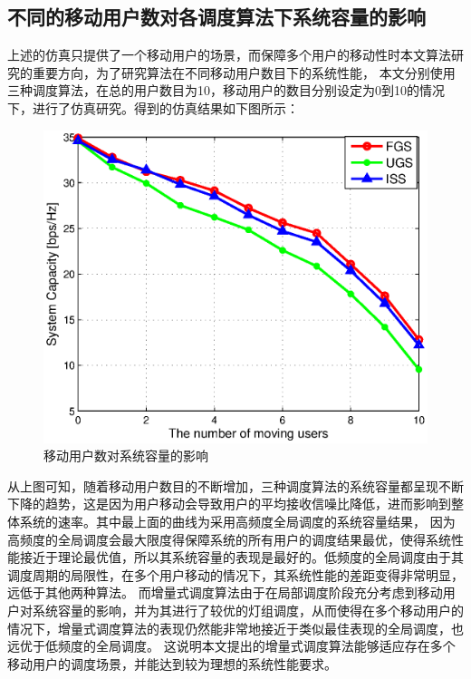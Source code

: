\subsection{不同的移动用户数对各调度算法下系统容量的影响}
上述的仿真只提供了一个移动用户的场景，而保障多个用户的移动性时本文算法研究的重要方向，为了研究算法在不同移动用户数目下的系统性能，
本文分别使用三种调度算法，在总的用户数目为10，移动用户的数目分别设定为0到10的情况下，进行了仿真研究。得到的仿真结果如下图所示：

\begin{figure}[htbp]
    \centering
	\includegraphics[width=\textwidth]{figures/chapter-5/MovingUserNum2Capacity.eps}
	\caption{移动用户数对系统容量的影响}
	\label{fig:moving-user-num-2-capacity}
\end{figure}

从上图可知，随着移动用户数目的不断增加，三种调度算法的系统容量都呈现不断下降的趋势，这是因为用户移动会导致用户的平均接收信噪比降低，进而影响到整体系统的速率。其中最上面的曲线为采用高频度全局调度的系统容量结果，
因为高频度的全局调度会最大限度得保障系统的所有用户的调度结果最优，使得系统性能接近于理论最优值，所以其系统容量的表现是最好的。低频度的全局调度由于其调度周期的局限性，在多个用户移动的情况下，其系统性能的差距变得非常明显，远低于其他两种算法。
而增量式调度算法由于在局部调度阶段充分考虑到移动用户对系统容量的影响，并为其进行了较优的灯组调度，从而使得在多个移动用户的情况下，增量式调度算法的表现仍然能非常地接近于类似最佳表现的全局调度，也远优于低频度的全局调度。
这说明本文提出的增量式调度算法能够适应存在多个移动用户的调度场景，并能达到较为理想的系统性能要求。


